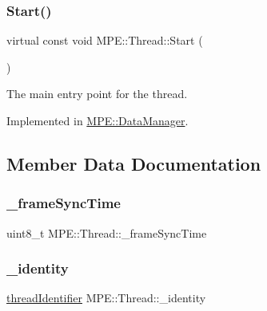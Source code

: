 \subsubsection{\texorpdfstring{Start()}{Start()}}
{\footnotesize\ttfamily virtual const void M\+P\+E\+::\+Thread\+::\+Start (\begin{DoxyParamCaption}{ }\end{DoxyParamCaption})\hspace{0.3cm}{\ttfamily [pure virtual]}}



The main entry point for the thread. 



Implemented in \hyperlink{class_m_p_e_1_1_data_manager_aa8d6f1ef687afb532d968a3c1a42f324}{M\+P\+E\+::\+Data\+Manager}.



\subsection{Member Data Documentation}
\mbox{\label{class_m_p_e_1_1_thread_ad004c47c4002461c874eae460e18ed2a}} 
\subsubsection{\texorpdfstring{\+\_\+frame\+Sync\+Time}{\_frameSyncTime}}
{\footnotesize\ttfamily uint8\+\_\+t M\+P\+E\+::\+Thread\+::\+\_\+frame\+Sync\+Time\hspace{0.3cm}{\ttfamily [protected]}}

\mbox{\label{class_m_p_e_1_1_thread_ab7e98443f40fcf9182ea7bf954b8aaf2}} 
\subsubsection{\texorpdfstring{\+\_\+identity}{\_identity}}
{\footnotesize\ttfamily \hyperlink{namespace_m_p_e_a16447295e3105bd2ba2a9ea303566175}{thread\+Identifier} M\+P\+E\+::\+Thread\+::\+\_\+identity\hspace{0.3cm}{\ttfamily [protected]}}

